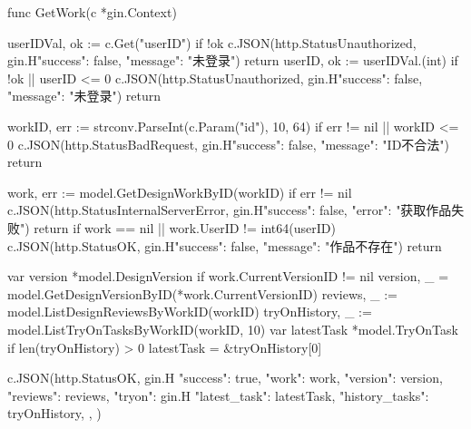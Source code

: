 \documentclass[twoside]{thesis-cls-Miya} %
\begin{document}
func GetWork(c *gin.Context) {
	userIDVal, ok := c.Get("userID")
	if !ok {
		c.JSON(http.StatusUnauthorized, gin.H{"success": false, "message": "未登录"})
		return
	}
	userID, ok := userIDVal.(int)
	if !ok || userID <= 0 {
		c.JSON(http.StatusUnauthorized, gin.H{"success": false, "message": "未登录"})
		return
	}

	workID, err := strconv.ParseInt(c.Param("id"), 10, 64)
	if err != nil || workID <= 0 {
		c.JSON(http.StatusBadRequest, gin.H{"success": false, "message": "ID不合法"})
		return
	}

	work, err := model.GetDesignWorkByID(workID)
	if err != nil {
		c.JSON(http.StatusInternalServerError, gin.H{"success": false, "error": "获取作品失败"})
		return
	}
	if work == nil || work.UserID != int64(userID) {
		c.JSON(http.StatusOK, gin.H{"success": false, "message": "作品不存在"})
		return
	}

	var version *model.DesignVersion
	if work.CurrentVersionID != nil {
		version, _ = model.GetDesignVersionByID(*work.CurrentVersionID)
	}
	reviews, _ := model.ListDesignReviewsByWorkID(workID)
	tryOnHistory, _ := model.ListTryOnTasksByWorkID(workID, 10)
	var latestTask *model.TryOnTask
	if len(tryOnHistory) > 0 {
		latestTask = &tryOnHistory[0]
	}

	c.JSON(http.StatusOK, gin.H{
		"success": true,
		"work":    work,
		"version": version,
		"reviews": reviews,
		"tryon": gin.H{
			"latest_task":   latestTask,
			"history_tasks": tryOnHistory,
		},
	})
}
\end{document}
